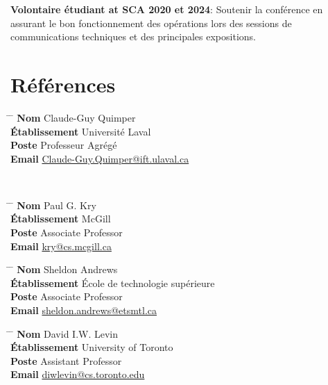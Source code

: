 \documentclass[10pt]{article} %
\begin{document}
\textbf{Volontaire étudiant at SCA 2020 et 2024}: Soutenir la conférence en assurant le bon fonctionnement des opérations lors des
sessions de communications techniques et des principales expositions.

\section{Références}

\parbox{0.5\textwidth}{ 
\begin{tabbing}
\hspace{2.75cm} \= \hspace{4cm} \= \kill 
{\bf Nom} \> Claude-Guy Quimper \\ 
{\bf Établissement} \> Université Laval \\ 
{\bf Poste} \> Professeur Agrégé \\  
{\bf Email} \> \href{mailto:Claude-Guy.Quimper@ift.ulaval.ca}{Claude-Guy.Quimper@ift.ulaval.ca} 
\end{tabbing}}\\

\parbox{0.5\textwidth}{
\begin{tabbing}
\hspace{2.75cm} \= \hspace{4cm} \= \kill
{\bf Nom} \> Paul G. Kry\\ 
{\bf Établissement} \> McGill\\ 
{\bf Poste} \> Associate Professor \\ 
{\bf Email} \> \href{mailto:kry@cs.mcgill.ca}{kry@cs.mcgill.ca}
\end{tabbing}}

\parbox{0.5\textwidth}{
\begin{tabbing}
\hspace{2.75cm} \= \hspace{4cm} \= \kill
{\bf Nom} \> Sheldon Andrews\\ 
{\bf Établissement} \> École de technologie supérieure\\ 
{\bf Poste} \> Associate Professor \\ 
{\bf Email} \> \href{mailto:sheldon.andrews@etsmtl.ca}{sheldon.andrews@etsmtl.ca}
\end{tabbing}}

\parbox{0.5\textwidth}{
\begin{tabbing}
\hspace{2.75cm} \= \hspace{4cm} \= \kill
{\bf Nom} \> David I.W. Levin\\ 
{\bf Établissement} \> University of Toronto\\ 
{\bf Poste} \>Assistant Professor \\ 
{\bf Email} \> \href{mailto:diwlevin@cs.toronto.edu}{diwlevin@cs.toronto.edu}
\end{tabbing}}


\end{document}
